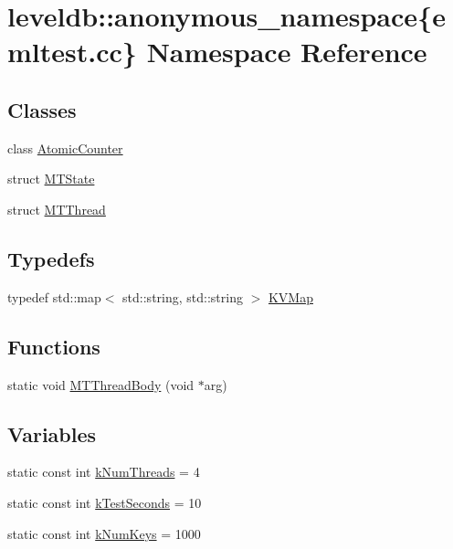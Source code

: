 \hypertarget{namespaceleveldb_1_1anonymous__namespace_02emltest_8cc_03}{}\section{leveldb\+:\+:anonymous\+\_\+namespace\{emltest.\+cc\} Namespace Reference}
\label{namespaceleveldb_1_1anonymous__namespace_02emltest_8cc_03}
\subsection*{Classes}
\begin{DoxyCompactItemize}
\item 
class \hyperlink{classleveldb_1_1anonymous__namespace_02emltest_8cc_03_1_1_atomic_counter}{Atomic\+Counter}
\item 
struct \hyperlink{structleveldb_1_1anonymous__namespace_02emltest_8cc_03_1_1_m_t_state}{M\+T\+State}
\item 
struct \hyperlink{structleveldb_1_1anonymous__namespace_02emltest_8cc_03_1_1_m_t_thread}{M\+T\+Thread}
\end{DoxyCompactItemize}
\subsection*{Typedefs}
\begin{DoxyCompactItemize}
\item 
typedef std\+::map$<$ std\+::string, std\+::string $>$ \hyperlink{namespaceleveldb_1_1anonymous__namespace_02emltest_8cc_03_adf65c921da5352324e1f8bf65a538a75}{K\+V\+Map}
\end{DoxyCompactItemize}
\subsection*{Functions}
\begin{DoxyCompactItemize}
\item 
static void \hyperlink{namespaceleveldb_1_1anonymous__namespace_02emltest_8cc_03_aa224d0d02af25c4bd7e2d3c550a82c7a}{M\+T\+Thread\+Body} (void $\ast$arg)
\end{DoxyCompactItemize}
\subsection*{Variables}
\begin{DoxyCompactItemize}
\item 
static const int \hyperlink{namespaceleveldb_1_1anonymous__namespace_02emltest_8cc_03_a26fa4b352f376c5bc4b01fdda6123d79}{k\+Num\+Threads} = 4
\item 
static const int \hyperlink{namespaceleveldb_1_1anonymous__namespace_02emltest_8cc_03_a6f62e4c714e736d0315cca1c1e1a3643}{k\+Test\+Seconds} = 10
\item 
static const int \hyperlink{namespaceleveldb_1_1anonymous__namespace_02emltest_8cc_03_abf454747366343aa19b1683189417f28}{k\+Num\+Keys} = 1000
\end{DoxyCompactItemize}


